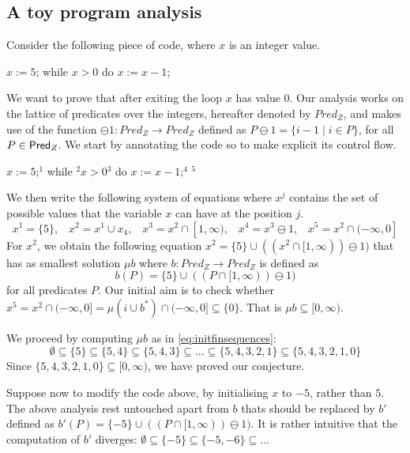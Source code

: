 \documentclass{llncs}
\begin{document}
\subsection{A toy program analysis}
Consider the following piece of code, where \texttt{$x$} is an integer value.
\begin{codeNT}
$x := 5$;  while $x>0$ do { $x:=x-1$; }
\end{codeNT}
We want to prove that after exiting the loop \texttt{$x$} has value $0$. Our analysis works on the lattice of predicates over the integers, hereafter denoted by $Pred_Z$, and makes use of the function $\ominus \!1 \colon Pred_Z \to Pred_Z$ defined as $P\ominus \!1 = \{i-1\mid i\in P  \}$, for all $P\in \mathsf{Pred}_Z$. We start by annotating the code so to make explicit its control flow.
\begin{codeNT}
$x := 5$;$^{1}$  while $^{2}$$x>0$$^{3}$ do { $x:=x-1$;$^{4}$ }$^{5}$
\end{codeNT}
We then write the following system of equations where $x^j$ contains the set of possible values that the variable \texttt{$x$} can have at the position $j$.
\begin{equation*}
x^1=\{5\},  \;\;\; x^2 = x^1\cup x_4, \; \; \; x^3 = x^2 \cap [1,\infty), \;\; \; x^4 = x^3 \ominus 1, \; \;\;  x^5 = x^2 \cap (-\infty, 0]
\end{equation*}
For $x^2$, we obtain the following equation
$ x^2 = \{5\} \cup ( (x^2 \cap [1,\infty) ) \ominus \!1 )$ that has as smallest solution $\mu b$ where $b\colon Pred_Z \to Pred_Z$ is defined as 
\begin{equation}\label{eq:babstractInt}
b(P) = \{5\} \cup ( (P\cap [1,\infty) ) \ominus\! 1 )
\end{equation} for all predicates $P$. Our initial aim is to check whether $x^5 = x^2 \cap (-\infty, 0] = \mu (i \cup b^*)\cap (-\infty, 0]  \subseteq \{0\}$. That is $\mu b \subseteq [0,\infty)$. 

We proceed by computing $\mu b$ as in \eqref{eq:initfinsequences}:
\begin{equation}\label{eq:lfpcomp}
\emptyset \subseteq \{5\} \subseteq \{5,4\} \subseteq \{5,4,3\} \subseteq \dots \subseteq \{5,4,3,2,1\} \subseteq \{5,4,3,2,1,0\}
\end{equation}
Since $\{5,4,3,2,1,0\} \subseteq [0,\infty)$, we have proved our conjecture.

Suppose now to modify the code above, by initialising  \texttt{$x$} to $-5$, rather than $5$. The above analysis rest untouched  apart from $b$ thats should be replaced by $b'$ defined as $b'(P) = \{-5\} \cup ( (P\cap [1,\infty) ) \ominus\! 1 )$. It is rather intuitive that the computation of $b'$ diverges: $\emptyset \subseteq \{-5\} \subseteq \{-5,-6\} \subseteq \dots$
\end{document}
